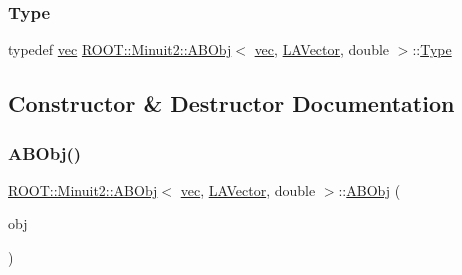 \mbox{\label{classROOT_1_1Minuit2_1_1ABObj_3_01vec_00_01LAVector_00_01double_01_4_a4b4f01cea6a833a82f65ddadd8cb0f40}} 
\subsubsection{\texorpdfstring{Type}{Type}\hspace{0.1cm}{\footnotesize\ttfamily [3/3]}}
{\footnotesize\ttfamily typedef \mbox{\hyperlink{classROOT_1_1Minuit2_1_1vec}{vec}} \mbox{\hyperlink{classROOT_1_1Minuit2_1_1ABObj}{R\+O\+O\+T\+::\+Minuit2\+::\+A\+B\+Obj}}$<$ \mbox{\hyperlink{classROOT_1_1Minuit2_1_1vec}{vec}}, \mbox{\hyperlink{classROOT_1_1Minuit2_1_1LAVector}{L\+A\+Vector}}, double $>$\+::\mbox{\hyperlink{classROOT_1_1Minuit2_1_1ABObj_3_01vec_00_01LAVector_00_01double_01_4_a4b4f01cea6a833a82f65ddadd8cb0f40}{Type}}}



\subsection{Constructor \& Destructor Documentation}
\mbox{\label{classROOT_1_1Minuit2_1_1ABObj_3_01vec_00_01LAVector_00_01double_01_4_a3b8232d5f2becc9d30bcbc5ad933e41a}} 
\subsubsection{\texorpdfstring{ABObj()}{ABObj()}\hspace{0.1cm}{\footnotesize\ttfamily [1/9]}}
{\footnotesize\ttfamily \mbox{\hyperlink{classROOT_1_1Minuit2_1_1ABObj}{R\+O\+O\+T\+::\+Minuit2\+::\+A\+B\+Obj}}$<$ \mbox{\hyperlink{classROOT_1_1Minuit2_1_1vec}{vec}}, \mbox{\hyperlink{classROOT_1_1Minuit2_1_1LAVector}{L\+A\+Vector}}, double $>$\+::\mbox{\hyperlink{classROOT_1_1Minuit2_1_1ABObj}{A\+B\+Obj}} (\begin{DoxyParamCaption}\item[{const \mbox{\hyperlink{classROOT_1_1Minuit2_1_1LAVector}{L\+A\+Vector}} \&}]{obj }\end{DoxyParamCaption})\hspace{0.3cm}{\ttfamily [inline]}}

